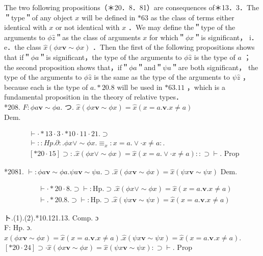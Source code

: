 \documentclass[10pt]{article}
\begin{document}
The two following propositions（＊20．8．81）are consequences of＊13．3．The ＂type＂of any object $x$ will be defined in $* 63$ as the class of terms either identical with $x$ or not identical with $x$ ．We may define the＂type of the arguments to $\phi \hat{z}$＂as the class of arguments $x$ for which＂$\phi x$＂is significant， i．e．the class $\hat{x}(\phi x \mathbf{v} \sim \phi x)$ ．Then the first of the following propositions shows that if＂$\phi a$＂is significant，the type of the arguments to $\phi \hat{z}$ is the type of $a$ ； the second proposition shows that，if＂$\phi a$＂and＂$\psi a$＂are both significant， the type of the arguments to $\phi \hat{z}$ is the same as the type of the arguments to $\psi \hat{z}$ ，because each is the type of $a . * 20.8$ will be used in $* 63.11$ ，which is a fundamental proposition in the theory of relative types．\\
*208. $F: \phi a \mathbf{v} \sim \phi a$. つ. $\hat{x}(\phi x \mathbf{v} \sim \phi x)=\hat{x}(x=a . \mathbf{v} . x \neq a)$\\
Dem.

$$
\begin{aligned}
& \vdash \cdot * 13 \cdot 3 \cdot * 10 \cdot 11 \cdot 21 . \supset \\
& \vdash:: H p . \partial: . \phi x \vee \sim \phi x . \equiv_{x}: x=a . \vee \cdot x \neq a: . \\
& {[* 20 \cdot 15] \supset: . \hat{x}(\phi x \vee \sim \phi x)=\hat{x}(x=a . \vee \cdot x \neq a):: \supset \vdash . \text { Prop }}
\end{aligned}
$$

*2081. $\vdash: \phi a \mathbf{v} \sim \phi a . \psi a \mathbf{v} \sim \psi a . \supset . \hat{x}(\phi x \mathbf{v} \sim \phi x)=\hat{x}(\psi x \mathbf{v} \sim \psi x)$ Dem.


\begin{align*}
& \vdash \cdot * 20 \cdot 8 . \supset \vdash: \mathrm{Hp} . \supset . \hat{x}(\phi x \vee \sim \phi x)=\widehat{x}(x=a . \mathbf{v} . x \neq a)  \tag{1}\\
& \vdash . * 20.8 . \supset \vdash: \mathrm{Hp} . \supset . \hat{x}(\psi x \mathbf{v} \sim \psi x)=\widehat{x}(x=a . \mathbf{v} . x \neq a) \tag{2}
\end{align*}


ト.(1).(2).*10.121.13. Comp. ɔ\\
F: Hp. ɔ. $\hat{x}(\phi x \mathbf{v} \sim \phi x)=\hat{x}(x=a . \mathbf{v} . x \neq a) . \hat{x}(\psi x \mathbf{v} \sim \psi x)=\hat{x}(x=a . \mathbf{v} . x \neq a)$. $[* 20 \cdot 24] \supset \cdot \hat{x}(\phi x \mathbf{v} \sim \phi x)=\hat{x}(\psi x \mathbf{v} \sim \psi x): \supset \vdash$. Prop
\end{document}
